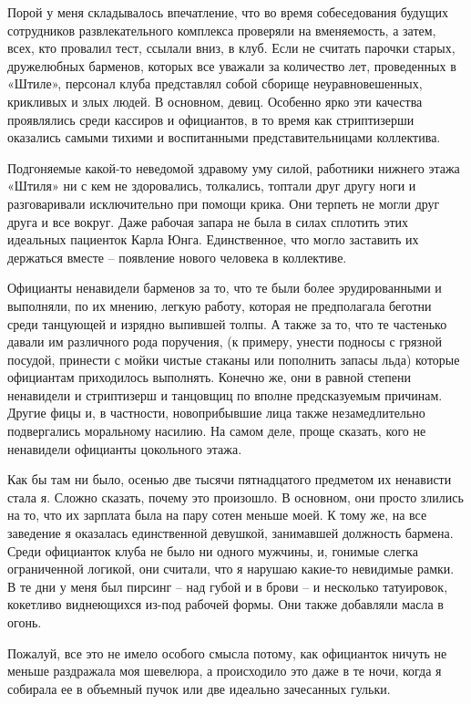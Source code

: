 \documentclass[
]{book}
\begin{document}
Порой у меня складывалось впечатление, что во время собеседования будущих сотрудников развлекательного комплекса проверяли на вменяемость, а затем, всех, кто провалил тест, ссылали вниз, в клуб. Если не считать парочки старых, дружелюбных барменов, которых все уважали за количество лет, проведенных в «Штиле», персонал клуба представлял собой сборище неуравновешенных, крикливых и злых людей. В основном, девиц. Особенно ярко эти качества проявлялись среди кассиров и официантов, в то время как стриптизерши оказались самыми тихими и воспитанными представительницами коллектива.

Подгоняемые какой-то неведомой здравому уму силой, работники нижнего этажа «Штиля» ни с кем не здоровались, толкались, топтали друг другу ноги и разговаривали исключительно при помощи крика. Они терпеть не могли друг друга и все вокруг. Даже рабочая запара не была в силах сплотить этих идеальных пациенток Карла Юнга. Единственное, что могло заставить их держаться вместе -- появление нового человека в коллективе.

Официанты ненавидели барменов за то, что те были более эрудированными и выполняли, по их мнению, легкую работу, которая не предполагала беготни среди танцующей и изрядно выпившей толпы. А также за то, что те частенько давали им различного рода поручения, (к примеру, унести подносы с грязной посудой, принести с мойки чистые стаканы или пополнить запасы льда) которые официантам приходилось выполнять. Конечно же, они в равной степени ненавидели и стриптизерш и танцовщиц по вполне предсказуемым причинам. Другие фицы и, в частности, новоприбывшие лица также незамедлительно подвергались моральному насилию. На самом деле, проще сказать, кого не ненавидели официанты цокольного этажа.

Как бы там ни было, осенью две тысячи пятнадцатого предметом их ненависти стала я. Сложно сказать, почему это произошло. В основном, они просто злились на то, что их зарплата была на пару сотен меньше моей. К тому же, на все заведение я оказалась единственной девушкой, занимавшей должность бармена. Среди официанток клуба не было ни одного мужчины, и, гонимые слегка ограниченной логикой, они считали, что я нарушаю какие-то невидимые рамки. В те дни у меня был пирсинг -- над губой и в брови -- и несколько татуировок, кокетливо виднеющихся из-под рабочей формы. Они также добавляли масла в огонь.

Пожалуй, все это не имело особого смысла потому, как официанток ничуть не меньше раздражала моя шевелюра, а происходило это даже в те ночи, когда я собирала ее в объемный пучок или две идеально зачесанных гульки.
\end{document}
